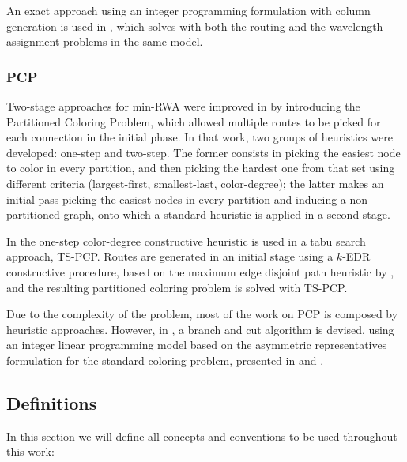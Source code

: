 An exact approach using an integer programming formulation with column generation is used in \cite{lee2002optimization}, which solves with both the routing and the wavelength assignment problems in the same model.

\subsubsection*{PCP}

Two-stage approaches for min-RWA were improved in \cite{Li00thepartition} by introducing the Partitioned Coloring Problem, which allowed multiple routes to be picked for each connection in the initial phase. In that work, two groups of heuristics were developed: one-step and two-step. The former consists in picking the easiest node to color in every partition, and then picking the hardest one from that set using different criteria (largest-first, smallest-last, color-degree); the latter makes an initial pass picking the easiest nodes in every partition and inducing a non-partitioned graph, onto which a standard heuristic is applied in a second stage.

In \cite{noronha2006routing} the one-step color-degree constructive heuristic is used in a tabu search approach, TS-PCP. Routes are generated in an initial stage using a $k$-EDR constructive procedure, based on the maximum edge disjoint path heuristic by \cite{kleinberg1996approximation}, and the resulting partitioned coloring problem is solved with TS-PCP.

Due to the complexity of the problem, most of the work on PCP is composed by heuristic approaches. However, in \cite{frota2010branch}, a branch and cut algorithm is devised, using an integer linear programming model based on the asymmetric representatives formulation for the standard coloring problem, presented in \cite{campelo2004cliques} and \cite{campelo2008asymmetric}.

\subsection{Definitions}
\label{subsec:intro:definitions}

In this section we will define all concepts and conventions to be used throughout this work: 

